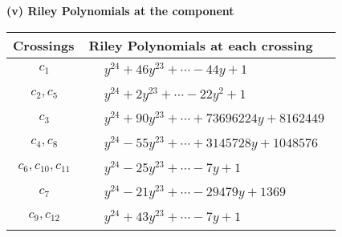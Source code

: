 \documentclass[1p]{elsarticle_modified}
\theoremstyle{definition}
\begin{document}
\newpage\renewcommand{\arraystretch}{1}
\flushleft \textbf{(v) Riley Polynomials at the component}\newline \\
\begin{tabular}{m{50pt}|m{274pt}}
Crossings & \hspace{64pt}Riley Polynomials at each crossing \\
\hline $$\begin{aligned}c_{1}\end{aligned}$$&$\begin{aligned}
&y^{24}+46 y^{23}+\cdots-44 y+1
\end{aligned}$\\
\hline $$\begin{aligned}c_{2},c_{5}\end{aligned}$$&$\begin{aligned}
&y^{24}+2 y^{23}+\cdots-22 y^2+1
\end{aligned}$\\
\hline $$\begin{aligned}c_{3}\end{aligned}$$&$\begin{aligned}
&y^{24}+90 y^{23}+\cdots+73696224 y+8162449
\end{aligned}$\\
\hline $$\begin{aligned}c_{4},c_{8}\end{aligned}$$&$\begin{aligned}
&y^{24}-55 y^{23}+\cdots+3145728 y+1048576
\end{aligned}$\\
\hline $$\begin{aligned}c_{6},c_{10},c_{11}\end{aligned}$$&$\begin{aligned}
&y^{24}-25 y^{23}+\cdots-7 y+1
\end{aligned}$\\
\hline $$\begin{aligned}c_{7}\end{aligned}$$&$\begin{aligned}
&y^{24}-21 y^{23}+\cdots-29479 y+1369
\end{aligned}$\\
\hline $$\begin{aligned}c_{9},c_{12}\end{aligned}$$&$\begin{aligned}
&y^{24}+43 y^{23}+\cdots-7 y+1
\end{aligned}$\\
\hline
\end{tabular}\\~\\
\end{document}
